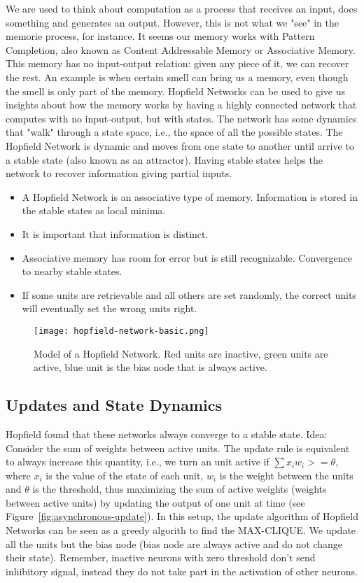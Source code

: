 \documentclass[main]{subfiles}
\begin{document}
We are used to think about computation as a process that receives an input, does something and generates an output.
However, this is not what we "see" in the memorie process, for instance.
It seems our memory works with Pattern Completion, also known as Content Addressable Memory or Associative Memory.
This memory has no input-output relation: given any piece of it, we can recover the rest.
An example is when certain smell can bring us a memory, even though the smell is only part of the memory.
Hopfield Networks can be used to give us insights about how the memory works by having a highly connected network that computes with no input-output, but with states.
The network has some dynamics that "walk" through a state space, i.e., the space of all the possible states. The Hopfield Network is dynamic and moves from one state to another until arrive to a stable state (also known as an attractor). Having stable states helps the network to recover information giving partial inputs.


\begin{itemize}[noitemsep,nolistsep]
	\item A Hopfield Network is an associative type of memory. Information is stored in the stable states as local minima.
	\item It is important that information is distinct.
	\item Associative memory has room for error but is still recognizable. Convergence to nearby stable states.
	\item If some units are retrievable and all others are set randomly, the correct units will eventually set the wrong units right.
\end{itemize}

\begin{figure}[H]
	\centering
	\texttt{[image: hopfield-network-basic.png]}
	\caption{Model of a Hopfield Network. Red units are inactive, green units are active, blue unit is the bias node that is always active.}
\end{figure}

\subsection{Updates and State Dynamics}

Hopfield found that these networks always converge to a stable state.
Idea: Consider the sum of weights between active units.
The update rule is equivalent to always increase this quantity, i.e., we turn an unit active if $\sum x_i w_i >= \theta$, where $x_i$ is the value of the state of each unit, $w_i$ is the weight between the units and $\theta$ is the threshold, thus maximizing the sum of active weights (weights between active units) by updating the output of one unit at time (see Figure~\ref{fig:asynchronous-update}).
In this setup, the update algorithm of Hopfield Networks can be seen as a greedy algorith to find the MAX-CLIQUE.
We update all the units but the bias node (bias node are always active and do not change their state).
Remember, inactive neurons with zero threshold don't send inhibitory signal, instead they do not take part in the activation of other neurons.
\end{document}
